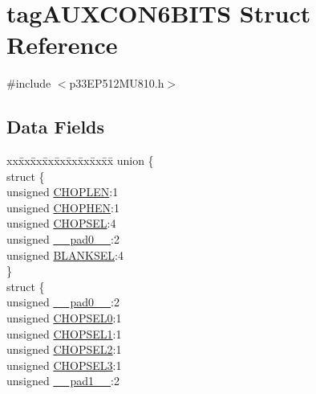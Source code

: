 \hypertarget{structtag_a_u_x_c_o_n6_b_i_t_s}{}\section{tag\+A\+U\+X\+C\+O\+N6\+B\+I\+TS Struct Reference}
\label{structtag_a_u_x_c_o_n6_b_i_t_s}


{\ttfamily \#include $<$p33\+E\+P512\+M\+U810.\+h$>$}

\subsection*{Data Fields}
\begin{DoxyCompactItemize}
\item 
\begin{tabbing}
xx\=xx\=xx\=xx\=xx\=xx\=xx\=xx\=xx\=\kill
union \{\\
\>struct \{\\
\>\>unsigned \hyperlink{structtag_a_u_x_c_o_n6_b_i_t_s_a3ef61325b83d3685e2364392dd43dd06}{CHOPLEN}:1\\
\>\>unsigned \hyperlink{structtag_a_u_x_c_o_n6_b_i_t_s_a38243e11a4372e45b55166fcec4322fa}{CHOPHEN}:1\\
\>\>unsigned \hyperlink{structtag_a_u_x_c_o_n6_b_i_t_s_aafc704d0a50b4ba0c019d33514cb7782}{CHOPSEL}:4\\
\>\>unsigned \hyperlink{structtag_a_u_x_c_o_n6_b_i_t_s_adf71f3d8410c1f1dbbc96680a92c49af}{\_\_pad0\_\_}:2\\
\>\>unsigned \hyperlink{structtag_a_u_x_c_o_n6_b_i_t_s_a16dd126500ffc8232d3b8e619c4406a2}{BLANKSEL}:4\\
\>\} \\
\>struct \{\\
\>\>unsigned \hyperlink{structtag_a_u_x_c_o_n6_b_i_t_s_adf71f3d8410c1f1dbbc96680a92c49af}{\_\_pad0\_\_}:2\\
\>\>unsigned \hyperlink{structtag_a_u_x_c_o_n6_b_i_t_s_acc4daaf21ff4590b40d3f25dad388167}{CHOPSEL0}:1\\
\>\>unsigned \hyperlink{structtag_a_u_x_c_o_n6_b_i_t_s_a5be3cb702a6c27dd28ee2f7bb142c88c}{CHOPSEL1}:1\\
\>\>unsigned \hyperlink{structtag_a_u_x_c_o_n6_b_i_t_s_ae9a19a5d1e40ae671a2b05fa09e77c10}{CHOPSEL2}:1\\
\>\>unsigned \hyperlink{structtag_a_u_x_c_o_n6_b_i_t_s_a6bcb1f80b40842c9ebd3c9d76d4c196f}{CHOPSEL3}:1\\
\>\>unsigned \hyperlink{structtag_a_u_x_c_o_n6_b_i_t_s_acaf2d0924a107ec6e8d2e31febaf66f9}{\_\_pad1\_\_}:2\\

\end{tabbing}
\end{DoxyCompactItemize}
